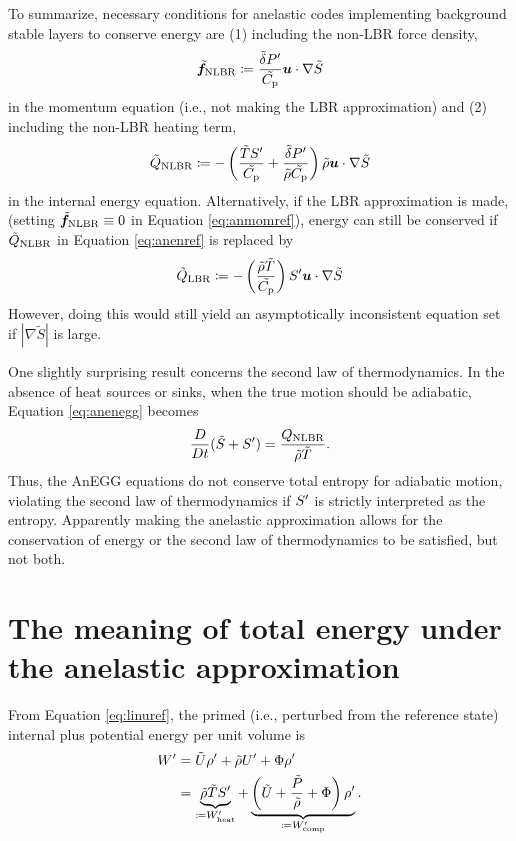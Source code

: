 \documentclass[12pt]{article}
\newcommand{\wpheat}{W^\prime_{\rm heat}}
\newcommand{\wpcomp}{W^\prime_{\rm comp}}
\begin{document}
To summarize, necessary conditions for anelastic codes implementing background stable layers to conserve energy are (1) including the non-LBR force density,
\begin{align}\label{eq:nlbrmomref}
	\tilde{\bm{f}}_{\rm NLBR} \coloneqq\frac{\tilde{\delta} P^\prime}{\tilde{C_{\rm{p}}}} \bm{u}\cdot \nabla\tilde{S} 
\end{align}
in the momentum equation (i.e., not making the LBR approximation) and (2) including the non-LBR heating term,
\begin{align}\label{eq:nlbrheatref}
	\tilde{Q}_{\rm NLBR} \coloneqq -  \left(\frac{\tilde{T} S^\prime}{\tilde{C_{\rm{p}}}} + \frac{\tilde{\delta} P^\prime}{\tilde{\rho}\tilde{C_{\rm{p}}}}\right)  \tilde{\rho} \bm{u}\cdot\nabla\tilde{S}
\end{align}
in the internal energy equation. Alternatively, if the LBR approximation is made, (setting $\tilde{\bm{f}}_{\rm NLBR}\equiv0$ in Equation \eqref{eq:anmomref}), energy can still be conserved if $\tilde{Q}_{\rm NLBR}$ in Equation \eqref{eq:anenref} is replaced by
\begin{align}\label{eq:lbrheating}
	\tilde{Q}_{\rm LBR}\coloneqq - \left(\frac{\tilde{\rho}\tilde{T}}{\tilde{C_{\rm{p}}}} \right) S^\prime\bm{u}\cdot\nabla\tilde{S}
\end{align}
However, doing this would still yield an asymptotically inconsistent equation set if $|\nabla\tilde{S}|$ is large. 

One slightly surprising result concerns the second law of thermodynamics. In the absence of heat sources or sinks, when the true motion should be adiabatic, Equation \eqref{eq:anenegg} becomes
\begin{align}\label{eq:dsdtref}
	\frac{D}{Dt}(\tilde{S} + S^\prime) = \frac{Q_{\rm NLBR}}{\tilde{\rho}\tilde{T}}.
\end{align}
Thus, the AnEGG equations do not conserve total entropy for adiabatic motion, violating the second law of thermodynamics if $S^\prime$ is strictly interpreted as the entropy. Apparently making the anelastic approximation allows for the conservation of energy or the second law of thermodynamics to be satisfied, but not both. 

\section{The meaning of total energy under the anelastic approximation}\label{sec:meaningtote}
From Equation \eqref{eq:linuref}, the primed (i.e., perturbed from the reference state) internal plus potential energy per unit volume is 
\begin{align}\label{eq:perten1}
	W^\prime &= \tilde{U}\rhoprime + \rhotilde U^\prime + \Phi \rhoprime \nonumber\\
	&= \underbrace{\rhotilde\tilde{T} \entrprime}_{\define \wpheat} + \underbrace{\left(\tilde{U}+\frac{\tilde{P}}{\rhotilde}+\Phi\right)\rhoprime}_{\define\wpcomp}.
\end{align}
\end{document}

